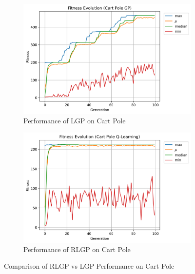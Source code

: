 \documentclass[12pt, final]{dalcsthesis}
\begin{document}
\begin{figure}[hb]
	\centering
	\begin{subfigure}{1.0\textwidth}
		\includegraphics[width=\linewidth]{cart_pole_lgp.png}
		\caption{Performance of LGP on Cart Pole}
		\label{fig:cart-pole-lgp}
	\end{subfigure}
	\hfill
	\begin{subfigure}{1.0\textwidth}
		\includegraphics[width=\linewidth]{cart_pole_q.png}
		\caption{Performance of RLGP on Cart Pole}
		\label{fig:cart-pole-q}
	\end{subfigure}
	\caption{Comparison of RLGP vs LGP Performance on Cart Pole}
	\label{fig:cart-pole-comparison}
\end{figure}
\end{document}
